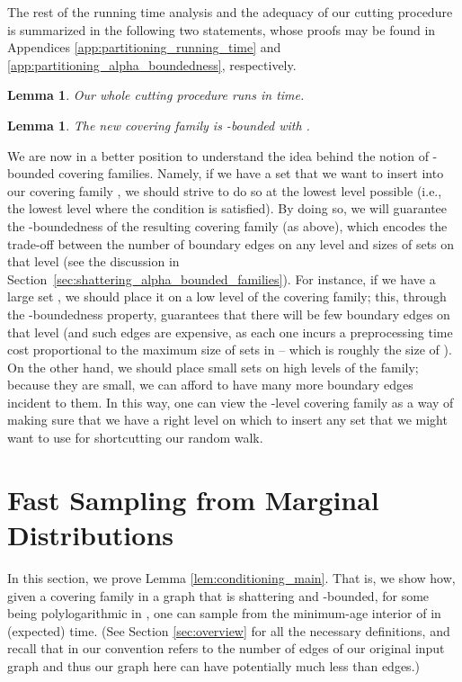 \documentclass[11pt, letterpaper]{article}
\newtheorem{lemma}[theorem]{Lemma}
\begin{document}
The rest of the running time analysis and the adequacy of our cutting procedure is summarized in the following two statements, whose proofs may be found in Appendices \ref{app:partitioning_running_time} and \ref{app:partitioning_alpha_boundedness}, respectively.

\begin{lemma} \label{lem:partitioning_running_time}
Our whole cutting procedure runs in  time.
\end{lemma}

\begin{lemma} \label{lem:partitioning_alpha_boundedness}
The new covering family  is -bounded with .
\end{lemma}


We are now in a better position to understand the idea behind the notion of -bounded covering families. Namely, if we have a set  that we want to insert into our covering family , we should strive to do so at the lowest level possible (i.e., the lowest level  where the condition  is satisfied). By doing so, we will guarantee the -boundedness of the resulting covering family (as above), which encodes the trade-off between the number of boundary edges on any level  and sizes of sets on that level (see the discussion in Section~\ref{sec:shattering_alpha_bounded_families}). For instance, if we have a large set , we should place it on a low level  of the covering family; this, through the -boundedness property, guarantees that there will be few boundary edges on that level (and such edges are expensive, as each one incurs a preprocessing time cost proportional to the maximum size of sets in  -- which is roughly the size of ). On the other hand, we should place small sets on high levels of the family; because they are small, we can afford to have many more boundary edges incident to them.
In this way, one can view the -level covering family as a way of making sure that we have a right level  on which to insert any set  that we might want to use for shortcutting our random walk.
 \section{Fast Sampling from Marginal Distributions} \label{sec:sampling} 

In this section, we prove Lemma \ref{lem:conditioning_main}. That is, we show how, given a covering family  in a graph  that is shattering and -bounded, for some  being polylogarithmic in , one can sample from the minimum-age interior  of  in (expected)  time. (See Section \ref{sec:overview} for all the necessary definitions, and recall that in our convention  refers to the number of edges of our original input graph and thus our graph  here can have potentially much less than  edges.)
\end{document}
